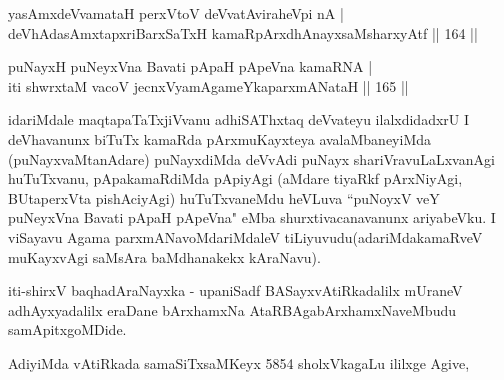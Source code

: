 
\begin{shl}
yasAmxdeVvamataH perxVtoV deVvatAviraheV\s pi nA |\\
deVhAdasAmxtapxriBarxSaTxH kamaRpArxdhAnayxsaMsharxyAtf \hfill || 164 ||
\end{shl}

\begin{shl}
puNayxH puNeyxVna Bavati pApaH pApeVna kamaRNA |\\
iti shwrxtaM vacoV jecnxVyamAgameYkaparxmANataH \hfill || 165 ||
\end{shl}

\begin{artha}
idariMdale maqtapaTaTxjiVvanu adhiSAThxtaq deVvateyu ilalxdidadxrU I deVhavanunx biTuTx kamaRda pArxmuKayxteya avalaMbaneyiMda (puNayxvaMtanAdare) puNayxdiMda deVvAdi puNayx shariVravuLaLxvanAgi huTuTxvanu, pApakamaRdiMda pApiyAgi (aMdare tiyaRkf pArxNiyAgi, BUtaperxVta pishAciyAgi) huTuTxvaneMdu heVLuva ``puNoyxV veY puNeyxVna Bavati pApaH pApeVna" eMba shurxtivacanavanunx ariyabeVku. I viSayavu Agama parxmANavoMdariMdaleV tiLiyuvudu(adariMdakamaRveV muKayxvAgi saMsAra baMdhanakekx kAraNavu).
\end{artha}

\begin{center}
iti-shirxV baqhadAraNayxka - upaniSadf BASayxvAtiRkadalilx mUraneV adhAyxyadalilx eraDane bArxhamxNa AtaRBAgabArxhamxNaveMbudu samApitxgoMDide.
\end{center}

\begin{center}
AdiyiMda vAtiRkada samaSiTxsaMKeyx 5854 sholxVkagaLu ililxge Agive,
\end{center}
